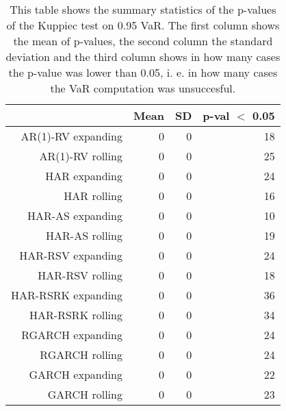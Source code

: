 \begin{table}[ht]
\centering
\begin{tabular}{rrrr}
  \hline
 & Mean & SD & p-val $<$ 0.05 \\ 
  \hline
AR(1)-RV expanding & 0 & 0 & 18 \\ 
  AR(1)-RV rolling & 0 & 0 & 25 \\ 
  HAR expanding & 0 & 0 & 24 \\ 
  HAR rolling & 0 & 0 & 16 \\ 
  HAR-AS expanding & 0 & 0 & 10 \\ 
  HAR-AS rolling & 0 & 0 & 19 \\ 
  HAR-RSV expanding & 0 & 0 & 24 \\ 
  HAR-RSV rolling & 0 & 0 & 18 \\ 
  HAR-RSRK expanding & 0 & 0 & 36 \\ 
  HAR-RSRK rolling & 0 & 0 & 34 \\ 
  RGARCH expanding & 0 & 0 & 24 \\ 
  RGARCH rolling & 0 & 0 & 24 \\ 
  GARCH expanding & 0 & 0 & 22 \\ 
  GARCH rolling & 0 & 0 & 23 \\ 
   \hline
\end{tabular}
\caption[Kupiec test p-values summary, alpha =0.95]{This table shows the summary statistics of the p-values of the Kuppiec test on 0.95 VaR. 
            The first column shows the mean of p-values, the second column the standard deviation 
            and the third column shows in how many cases the p-value was lower than 0.05, i. e. in how many cases the VaR computation was unsuccesful.} 
\label{Table:Kupiec_test_summary_0.95}
\end{table}
